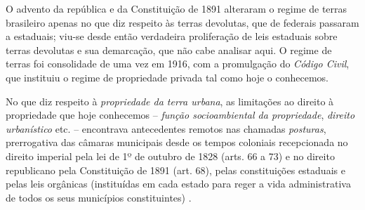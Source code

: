 O advento da república e da Constituição de 1891 alteraram o regime de terras brasileiro apenas no que diz respeito às terras devolutas, que de federais passaram a estaduais; viu-se desde então verdadeira proliferação de leis estaduais sobre terras devolutas e sua demarcação, que não cabe analisar aqui. O regime de terras foi consolidade de uma vez em 1916, com a promulgação do \textit{Código Civil}, que instituiu o regime de propriedade privada tal como hoje o conhecemos. 

No que diz respeito à \textit{propriedade da terra urbana}, as limitações ao direito à propriedade que hoje conhecemos -- \textit{função socioambiental da propriedade}, \textit{direito urbanístico} etc. -- encontrava antecedentes remotos nas chamadas \textit{posturas}, prerrogativa das câmaras municipais desde os tempos coloniais recepcionada no direito imperial pela lei de 1º de outubro de 1828 (arts. 66 a 73) e no direito republicano pela Constituição de 1891 (art. 68), pelas constituições estaduais e pelas leis orgânicas (instituídas em cada estado para reger a vida administrativa de todos os seus municípios constituintes) \cite{campanhole_const_1992}.